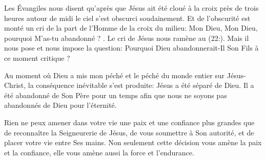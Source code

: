 Les Évangiles nous disent qu'après que Jésus ait été cloué à la croix
 près de trois heures \ocadr{}autour de midi\fcadr{} le ciel s'est obscurci soudainement.
 Et de l'obscurité est monté un cri de la part de l'Homme de la croix du milieu\space:
 \og Mon Dieu, Mon Dieu, pourquoi M'as-tu abandonné ? \fg{}.
 Le cri de Jésus nous ramène au (22:).
 Mais il nous pose et nous impose la question\space:
 Pourquoi Dieu abandonnerait-Il Son Fils à ce moment critique ?


Au moment où Dieu a mis mon péché \ocadr{}et le péché du monde entier\fcadr{}
 sur Jésus-Christ, la conséquence inévitable s'est produite\space:
 Jésus a été séparé de Dieu. Il a été abandonné de Son Père
 pour un temps afin que nous ne soyons pas abandonnés de Dieu pour l'éternité.

Rien ne peux amener dans votre vie une paix et une confiance plus grandes
 que de reconnaître la Seigneurerie de Jésus, de vous soumettre à Son autorité,
 et de placer votre vie entre Ses mains.
 Non seulement cette décision vous amène la paix et la confiance,
 elle vous amène aussi la force et l'endurance.

\dvrule




